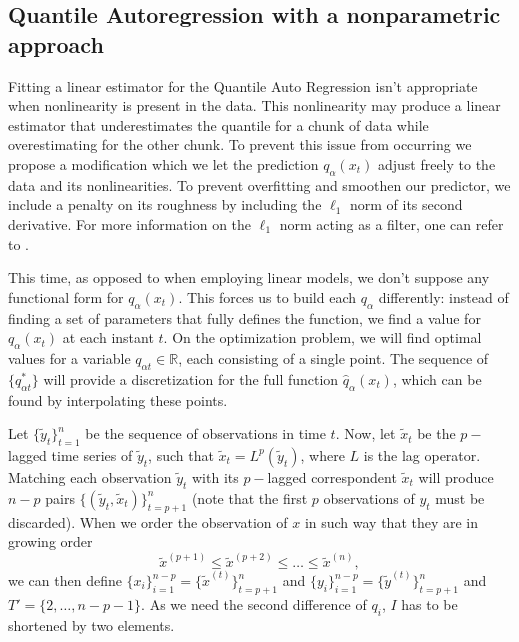 \subsection{Quantile Autoregression with a nonparametric approach}
\label{sec:npqar}

Fitting a linear estimator for the Quantile Auto Regression isn't appropriate  when nonlinearity is present in the data. This nonlinearity may produce a linear estimator that underestimates the quantile for a chunk of data while overestimating for the other chunk. To prevent this issue from occurring we propose a modification which we let the prediction $q_\alpha(x_t)$ adjust freely to the data and its nonlinearities. To prevent overfitting and smoothen our predictor, we include a penalty on its roughness by including the $\ell_1$ norm of its second derivative. For more information on the $\ell_1$ norm acting as a filter, one can refer to \cite{kim2009ell_1}.

This time, as opposed to when employing linear models, we don't suppose any functional form for $q_\alpha(x_t)$. This forces us to build each $q_\alpha$ differently: instead of finding a set of parameters that fully defines the function, we find a value for $q_\alpha(x_t)$ at each instant $t$. On the optimization problem, we will find optimal values for a variable $q_{\alpha t} \in \mathbb{R}$, each consisting of a single point. The sequence of $\{ q^*_{\alpha t} \} $ will provide a discretization for the full function $\hat{q}_\alpha(x_t)$, which can be found by interpolating these points.


Let $\{\tilde{y}_t \}_{t=1}^n$ be the sequence of observations in time $t$. Now, let $\tilde{x}_t$ be the $p-$lagged time series of $\tilde{y}_t$, such that $\tilde{x}_t = L^p(\tilde{y}_t)$, where $L$ is the lag operator. Matching each observation $\tilde{y}_t$ with its $p-$lagged correspondent $\tilde{x}_t$ will produce $n-p$ pairs $\{(\tilde{y}_t,\tilde{x}_t)\}_{t=p+1}^n$ (note that the first $p$ observations of $y_t$ must be discarded). When we order the observation of $x$ in such way that they are in growing order
$$\tilde{x}^{(p+1)} \leq \tilde{x}^{(p+2)} \leq \dots \leq \tilde{x}^{(n)},$$ 
we can then define $\{x_i\}_{i=1}^{n-p} = \{\tilde{x}^{(t)} \}_{t=p+1}^{n}$ and $\{y_i\}_{i=1}^{n-p} = \{\tilde{y}^{(t)} \}_{t=p+1}^{n}$ and $T' = \{2,\dots, n-p-1\}$. As we need the second difference of $q_i$, $I$ has to be shortened by two elements.

